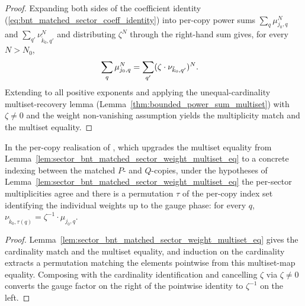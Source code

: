 \begin{proof}\leanok
    Expanding both sides of the coefficient identity
    (\ref{eq:bnt_matched_sector_coeff_identity}) into per-copy power sums
    $\sum_q \mu_{j_0, q}^N$ and $\sum_{q'} \nu_{\tilde k_0, q'}^N$ and
    distributing $\zeta^N$ through the right-hand sum gives, for every
    $N > N_0$,
    \begin{align}
        \sum_q \mu_{j_0, q}^N
         & = \sum_{q'} (\zeta \cdot \nu_{\tilde k_0, q'})^N.
        \notag
    \end{align}
    Extending to all positive exponents and applying the unequal-cardinality
    multiset-recovery lemma (Lemma~\ref{thm:bounded_power_sum_multiset})
    with $\zeta \neq 0$ and the weight non-vanishing assumption yields the
    multiplicity match and the multiset equality.
\end{proof}

\begin{lemma}%
    \label{lem:sector_bnt_matched_sector_weight_equiv}
    \leanok
    In the per-copy realisation of \cite[Appendix~A]{Cirac2016MPDO_arXiv},
    which upgrades the multiset equality from
    Lemma~\ref{lem:sector_bnt_matched_sector_weight_multiset_eq} to a concrete
    indexing between the matched $P$- and $Q$-copies, under the hypotheses of
    Lemma~\ref{lem:sector_bnt_matched_sector_weight_multiset_eq} the
    per-sector multiplicities agree and there is a permutation $\tau$ of
    the per-copy index set identifying the individual weights up to the
    gauge phase: for every $q$,
    $\nu_{\tilde k_0, \tau(q)} = \zeta^{-1} \cdot \mu_{j_0, q}$.
\end{lemma}

\begin{proof}\leanok
    Lemma~\ref{lem:sector_bnt_matched_sector_weight_multiset_eq} gives
    the cardinality match and the multiset equality, and induction on the
    cardinality extracts a permutation matching the elements pointwise from
    this multiset-map equality. Composing with the cardinality identification
    and cancelling $\zeta$ via $\zeta \neq 0$ converts the gauge factor on the
    right of the pointwise identity to $\zeta^{-1}$ on the left.
\end{proof}

